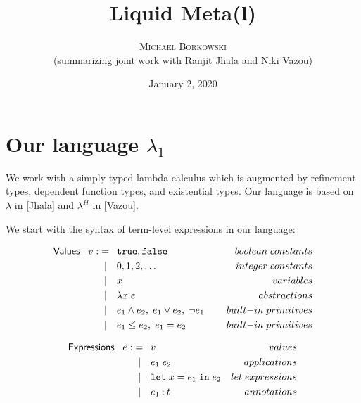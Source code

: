 \documentclass[11pt]{article}
\newcommand{\col}{\mathbin{:}}       %
\begin{document}
\title{Liquid Meta(l)}
\author{\textsc{Michael Borkowski} \\ (summarizing joint work with {\sc Ranjit Jhala} and {\sc Niki Vazou})}
\date{January 2, 2020}

\maketitle
\thispagestyle{empty}

\section{Our language $\lambda_1$}

We work with a simply typed lambda calculus which is augmented by refinement types, dependent function types, and existential types. Our language is based on $\lambda$ in [Jhala] and $\lambda^H$ in [Vazou].

We start with the syntax of term-level expressions in our language:

\begin{align*}
{\sf Values} \;\;\; v :&=\;\: {\tt true}, {\tt false}
                         {\kern 5em}& boolean\; constants\\
                   &\;\;|\quad 0, 1, 2, \ldots 
                         & integer \; constants\\
                   &\;\;|\quad x & variables\\
                   &\;\;|\quad \lambda x . e
                         & abstractions \\
                   &\;\;|\quad e_1 \wedge e_2,\; e_1 \vee e_2,
                         \;\neg e_1 
                         & built{\rm -}in\; primitives \\
                   &\;\;|\quad e_1 \leq e_2,\; e_1 = e_2
                         & built{\rm -}in\; primitives
\end{align*}

\begin{align*}
{\sf Expressions} \;\;\; e :&=\;\: v {\kern 5 em}& values \\
	                &\;\;|\quad e_1\; e_2 & applications \\
	                &\;\;|\quad {\tt let}\; x = e_1
	                      \; {\tt in} \; e_2 & let\; expressions\\
	                &\;\;|\quad e_1 \col t & annotations \\
\end{align*}
\end{document}
